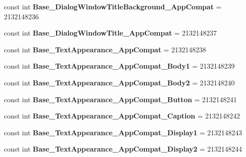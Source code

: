 \begin{DoxyCompactItemize}
const int {\bfseries Base\+\_\+\+Dialog\+Window\+Title\+Background\+\_\+\+App\+Compat} = 2132148236
\item 
\mbox{\label{classst_delivery_1_1_resource_1_1_style_a0bf69112f5b99d415f3a7c794b03224e}} 
const int {\bfseries Base\+\_\+\+Dialog\+Window\+Title\+\_\+\+App\+Compat} = 2132148237
\item 
\mbox{\label{classst_delivery_1_1_resource_1_1_style_a9bf1a152e4ad988420bc996286c4b320}} 
const int {\bfseries Base\+\_\+\+Text\+Appearance\+\_\+\+App\+Compat} = 2132148238
\item 
\mbox{\label{classst_delivery_1_1_resource_1_1_style_a25508e21f1ce278e25ef58028bf26513}} 
const int {\bfseries Base\+\_\+\+Text\+Appearance\+\_\+\+App\+Compat\+\_\+\+Body1} = 2132148239
\item 
\mbox{\label{classst_delivery_1_1_resource_1_1_style_a3e99c85fd680e81afc645dd5252d948a}} 
const int {\bfseries Base\+\_\+\+Text\+Appearance\+\_\+\+App\+Compat\+\_\+\+Body2} = 2132148240
\item 
\mbox{\label{classst_delivery_1_1_resource_1_1_style_a5e9957c72af0d13cdcbd7182d0d92501}} 
const int {\bfseries Base\+\_\+\+Text\+Appearance\+\_\+\+App\+Compat\+\_\+\+Button} = 2132148241
\item 
\mbox{\label{classst_delivery_1_1_resource_1_1_style_a26f5b47c589154a50862893780ecad6d}} 
const int {\bfseries Base\+\_\+\+Text\+Appearance\+\_\+\+App\+Compat\+\_\+\+Caption} = 2132148242
\item 
\mbox{\label{classst_delivery_1_1_resource_1_1_style_a684f13c687e5bb77911ae26135d86a80}} 
const int {\bfseries Base\+\_\+\+Text\+Appearance\+\_\+\+App\+Compat\+\_\+\+Display1} = 2132148243
\item 
\mbox{\label{classst_delivery_1_1_resource_1_1_style_ac3a73e4c9d465b044ed5f3e0300f0ec8}} 
const int {\bfseries Base\+\_\+\+Text\+Appearance\+\_\+\+App\+Compat\+\_\+\+Display2} = 2132148244

\end{DoxyCompactItemize}
